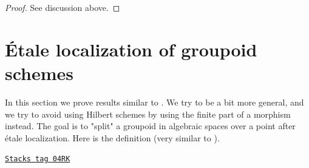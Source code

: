 \begin{proof}
See discussion above.
\end{proof}

\section{\'Etale localization of groupoid schemes}
\label{spaces-more-groupoids-section-etale-localize}
In this section we prove results similar to \cite[Proposition 4.2]{K-M}.
We try to be a bit more general, and we try to avoid using Hilbert schemes
by using the finite part of a morphism instead.
The goal is to "split" a groupoid in algebraic spaces over a point
after \'etale localization. Here is the definition (very similar to
\cite[Definition 4.1]{K-M}).

\begin{definition}
\label{spaces-more-groupoids-definition-split-at-point}
\href{https://stacks.math.columbia.edu/tag/04RK}{\texttt{Stacks tag 04RK}}


\end{definition}

